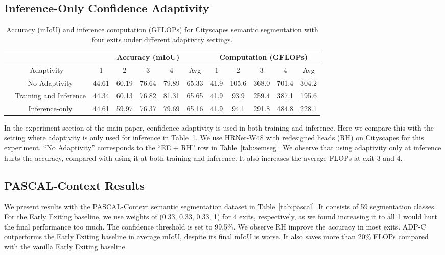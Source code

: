 \subsection{Inference-Only Confidence Adaptivity}
\begin{table}[h]
\vspace{0ex}
\centering
\footnotesize
\begin{tabular}{cc|ccccc|ccccc}
\hline
\multicolumn{2}{c|}{}                            & \multicolumn{5}{c}{Accuracy (mIoU)}         & \multicolumn{5}{|c}{Computation (GFLOPs)}            \\ \hline
\multicolumn{2}{c|}{Adaptivity}             & 1    & 2    & 3    & 4    & Avg  & 1     & 2     & 3     & 4      & Avg   \\ \hline
& No Adaptivity & 44.61  & 60.19 &  76.64  & 79.89 & 65.33   &   41.9 & 105.6 & 368.0 & 701.4 & 304.2  \\ 
& Training and Inference & 44.34 &  60.13 & 76.82 & 81.31  & 65.65 & 41.9 & 93.9 & 259.4 & 387.1 & 195.6  \\ 
& Inference-only & 44.61 &  59.97 &  76.37 &  79.69 & 65.16     & 41.9 &  94.1 &  291.8 & 484.8 & 228.1  \\ \hline
\end{tabular}
\caption{%
Accuracy (mIoU) and inference computation (GFLOPs) for Cityscapes semantic segmentation with four exits under different adaptivity settings.
}
\label{tab:inference-only}
\end{table}

In the experiment section of the main paper, confidence adaptivity is used in both training and inference. Here we compare this with the setting where adaptivity is only used for inference in Table~\ref{tab:inference-only}. We use HRNet-W48 with redesigned heads (RH) on Cityscapes for this experiment. ``No Adaptivity'' corresponds to the ``EE + RH'' row in Table~\ref{tab:semseg}. We observe that using adaptivity only at inference hurts the accuracy, compared with using it at both training and inference. It also increases the average FLOPs at exit 3 and 4.



\subsection{PASCAL-Context Results}
We present results with the PASCAL-Context semantic segmentation dataset \cite{mottaghi_cvpr14} in Table~\ref{tab:pascal}. It consists of 59 segmentation classes.
For the Early Exiting baseline, we use weights of (0.33, 0.33, 0.33, 1) for 4 exits, respectively, as we found increasing it to all 1 would hurt the final performance too much. 
The confidence threshold is set to 99.5\%. We observe RH improve the accuracy in most exits. ADP-C outperforms the Early Exiting baseline in average mIoU, despite its final mIoU is worse. It also saves more than 20\% FLOPs compared with the vanilla Early Exiting baseline.

